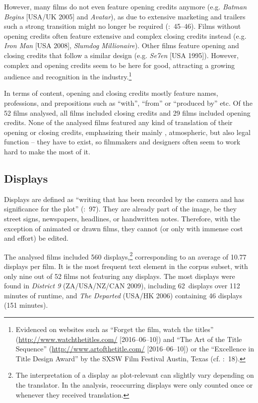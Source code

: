 However, many films do not even feature opening credits anymore (e.g. \textit{Batman Begins} [USA/UK 2005] and \textit{Avatar}), as due to extensive marketing and trailers such a strong transition might no longer be required (\citealt{quitsch2010}:~45--46). Films without opening credits often feature extensive and complex closing credits instead (e.g. \textit{Iron Man} [USA 2008], \textit{Slumdog Millionaire}). Other films feature opening and closing credits that follow a similar design (e.g. \textit{Se7en} [USA 1995]). However, complex and  opening credits seem to be here for good, attracting a growing audience and recognition in the industry.\footnote{Evidenced on websites such as “Forget the film, watch the titles” (\url{http://www.watchthetitles.com/} [2016--06--10]) and “The Art of the Title Sequence” (\url{http://www.artofthetitle.com/} [2016--06--10]) or the “Excellence in Title Design Award” by the SXSW Film Festival Austin, Texas (cf. \citealt{Hausberger2006}:~18).}

In terms of content, opening and closing credits mostly feature names, professions, and prepositions such as “with”, “from” or “produced by” etc. Of the 52 films analysed, all films included closing credits and 29 films included opening credits. None of the analysed films featured any kind of translation of their opening or closing credits, emphasizing their mainly , atmospheric, but also legal function – they have to exist, so filmmakers and designers often seem to work hard to make the most of it.

\subsection{Displays}\label{sec:2.4.3}
\largerpage[-1]%
Displays are defined as “writing that has been recorded by the camera and has significance for the plot” (\citealt{Ivarsson1998}:~97). They are already part of the image, be they street signs, newspapers, headlines, or handwritten notes. Therefore, with the exception of animated or drawn films, they cannot (or only with immense cost and effort) be edited.

The analysed films included 560 displays,\footnote{The interpretation of a display as plot-relevant can slightly vary depending on the translator. In the analysis, reoccurring displays were only counted once or whenever they received translation.} corresponding to an average of 10.77 displays per film. It is the most frequent text element in the corpus subset, with only nine out of 52 films not featuring any displays. The most displays were found in \textit{District 9} (ZA/USA/NZ/CAN 2009), including 62~displays over 112 minutes of runtime, and \textit{The Departed} (USA/HK 2006) containing 46 displays (151 minutes).

